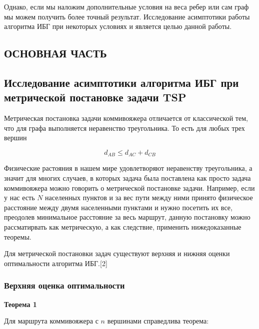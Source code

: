 \documentclass[a4paper, 14pt]{extarticle}
\numberwithin{equation}{section}
\begin{document}
Однако, если мы наложим дополнительные условия на веса ребер или сам граф мы можем получить более точный результат. Исследование асимптотики работы алгоритма ИБГ при некоторых условиях и является целью данной работы. \newline

\newpage

\begin{center}
\chapter{\textbf{ОСНОВНАЯ ЧАСТЬ}}
\end{center}

\setcounter{section}{0}


\section{Исследование асимптотики алгоритма ИБГ при метрической постановке задачи TSP}

Метрическая постановка задачи коммивояжера отличается от классической тем, что для графа выполняется неравенство треугольника. То есть для любых трех вершин

\begin{equation}
d_{AB} \leqslant d_{AC} + d_{CB}
\end{equation}

Физические растояния в нашем мире удовлетворяют неравенству треугольника, а значит для многих случаев, в которых задача была поставлена как просто задача коммивояжера можно говорить о метрической постановке задачи. Например, если у нас есть $N$ населенных пунктов и за вес пути между ними принято физическое расстояние между двумя  населенными пунктами и нужно посетить их все, преодолев минимальное расстояние за весь маршрут, данную постановку можно рассматирвать как метрическую, а как следствие, применить нижедоказанные теоремы.

Для метрической постановки задач существуют верхняя и нижняя оценки оптимальности алгоритма ИБГ.[2] \\


\subsection{Верхняя оценка оптимальности}

\textbf{Теорема 1}

Для маршрута коммивояжера с $n$ вершинами справедлива теорема:
\end{document}
